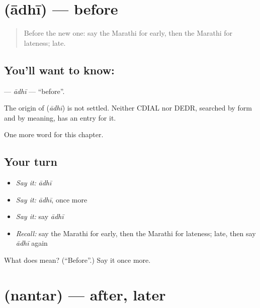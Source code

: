 \section[\texorpdfstring{\mr{आधी} (ādhī)}{आधी (ādhī)}]{ (ādhī) — before}

\label{lesson:MR-C111-adhi}



\begin{quote}
Before the new one: say the Marathi for early, then the Marathi for lateness; late.
\end{quote}

\subsection*{You'll want to know: }
\textbf{} — \emph{ādhī} — \textquotedblleft{}before\textquotedblright{}.

\begin{cousinweb}
The origin of \textbf{} (\emph{ādhī}) is not settled. Neither CDIAL nor DEDR, searched by form and by meaning, has an entry for it.
\end{cousinweb}

\begin{grammarlens}[title={What you've built}]
One more word for this chapter.
\end{grammarlens}

\subsection*{Your turn}
\begin{itemize}
\raggedright
  \item \emph{Say it:} \emph{ādhī}
  \item \emph{Say it:} \emph{ādhī}, once more
  \item \emph{Say it:} say \emph{ādhī}
  \item \emph{Recall:} say the Marathi for early, then the Marathi for lateness; late, then say \emph{ādhī} again
\end{itemize}

\begin{tcolorbox}[breakable,colback=teal!4,colframe=teal!35!black,title={Before you move on}]
What does  mean? (\textquotedblleft{}Before\textquotedblright{}.) Say it once more.
\end{tcolorbox}
\section[\texorpdfstring{\mr{नंतर} (nantar)}{नंतर (nantar)}]{ (nantar) — after, later}

